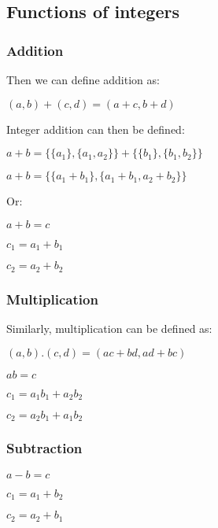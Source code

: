 \subsection{Functions of integers}

\subsubsection{Addition}

Then we can define addition as:

$(a,b)+(c,d)=(a+c,b+d)$

Integer addition can then be defined:

$a+b=\{\{a_1\},\{a_1,a_2\}\}+\{\{b_1\},\{b_1,b_2\}\}$

$a+b=\{\{a_1+b_1\},\{a_1+b_1,a_2+b_2\}\}$

Or:

$a+b=c$

$c_1=a_1+b_1$

$c_2=a_2+b_2$
\subsubsection{Multiplication}

Similarly, multiplication can be defined as:

$(a,b).(c,d)=(ac+bd, ad+bc)$

$ab=c$

$c_1=a_1b_1+a_2b_2$

$c_2=a_2b_1+a_1b_2$

\subsubsection{Subtraction}

$a-b=c$

$c_1=a_1+b_2$

$c_2=a_2+b_1$

